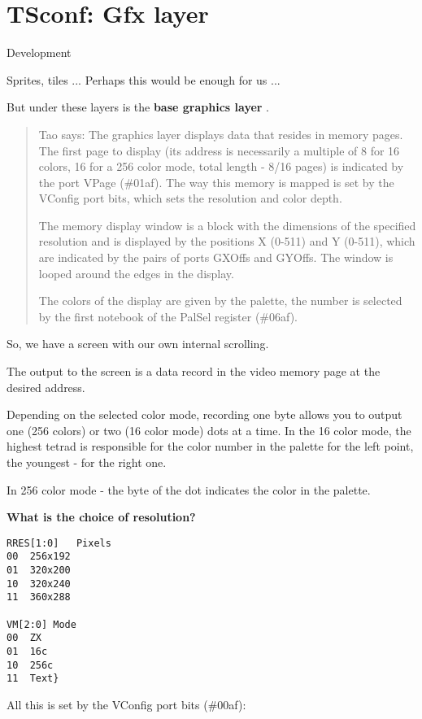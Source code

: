 \documentclass{article}
\begin{document}
\section*{TSconf: Gfx layer}

Development

Sprites, tiles ... Perhaps this would be enough for us ... 

But under these layers is the \textbf{base graphics layer} .

\begin{quotation}
  Tao says: The graphics layer displays data that resides in memory
  pages. The first page to display (its address is necessarily a
  multiple of 8 for 16 colors, 16 for a 256 color mode, total length -
  8/16 pages) is indicated by the port VPage (\#01af). The way this
  memory is mapped is set by the VConfig port bits, which sets the
  resolution and color depth.

  The memory display window is a block with the dimensions of the
  specified resolution and is displayed by the positions X (0-511) and
  Y (0-511), which are indicated by the pairs of ports GXOffs and
  GYOffs. The window is looped around the edges in the display.

  The colors of the display are given by the palette, the number is
  selected by the first notebook of the PalSel register (\#06af).
\end{quotation}

So, we have a screen with our own internal scrolling.

The output to the screen is a data record in the video memory page at
the desired address.

Depending on the selected color mode, recording one byte allows you to
output one (256 colors) or two (16 color mode) dots at a time. In the
16 color mode, the highest tetrad is responsible for the color number
in the palette for the left point, the youngest - for the right one.

In 256 color mode - the byte of the dot indicates the color in the
palette.

\textbf{What is the choice of resolution?}

\begin{verbatim}
RRES[1:0]	Pixels
00	256x192
01	320x200
10	320x240
11	360x288

VM[2:0]	Mode
00	ZX
01	16c
10	256c
11	Text}
\end{verbatim}

All this is set by the VConfig port bits (\#00af):
\end{document}
